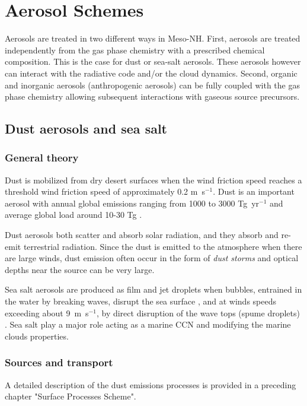 \chapter{Aerosol Schemes}
%
%
\minitoc
Aerosols are treated in two different ways in Meso-NH. 
First, aerosols are treated independently from 
the gas phase chemistry with a prescribed chemical composition. This is the 
case for dust or sea-salt aerosols. 
These aerosols however can interact with the radiative code and/or the cloud 
dynamics. Second, organic and inorganic aerosols (anthropogenic aerosols) can be fully coupled with the
gas phase chemistry allowing subsequent interactions with gaseous 
source precursors. 
\section{Dust aerosols and sea salt}
\subsection{General theory}

Dust is mobilized from dry desert surfaces when the wind friction 
speed reaches a threshold wind friction speed of approximately
0.2 m~s$^{-1}$. Dust is an important aerosol with annual global
 emissions ranging from 1000 to 3000 Tg~yr$^{-1}$ and average global
load around 10-30 Tg \citep{Zender2004}.

Dust aerosols both scatter and absorb solar radiation, and they absorb and
re-emit terrestrial radiation. Since the dust is emitted to the atmosphere
when there are large winds, dust emission often occur in the form of
{\it dust storms} and optical depths near the source can be very large.

Sea salt aerosols are produced as film and jet droplets when bubbles, entrained in the water by breaking waves, disrupt the sea surface \citep{Blanchard1983}, and at winds speeds exceeding about 9~m~s$^{-1}$, by direct disruption of the wave tops (spume droplets) \citep{Monahan1983}.
Sea salt play a major role acting as a marine CCN and modifying the marine clouds properties.


\subsection{Sources and transport}

A detailed description of the dust emissions processes is provided in a 
preceding chapter "Surface Processes Scheme".

